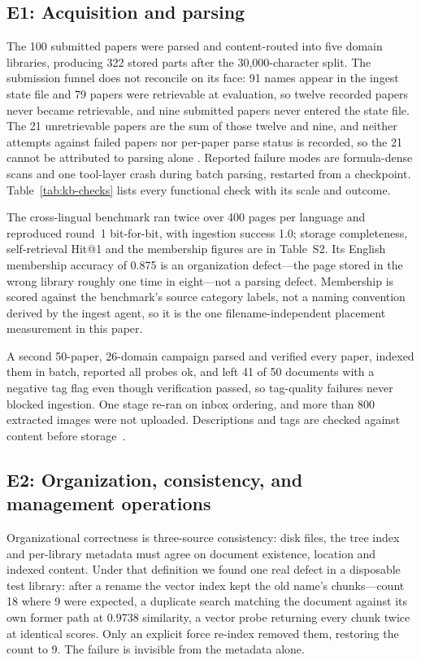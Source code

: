 \subsection{E1: Acquisition and parsing}
\label{sec:e1}

The 100 submitted papers were parsed and content-routed into five domain
libraries, producing 322 stored parts after the 30{,}000-character split. The
submission funnel does not reconcile on its face: 91 names appear in the ingest
state file and 79 papers were retrievable at evaluation, so twelve recorded
papers never became retrievable, and nine submitted papers never entered the
state file. The 21 unretrievable papers are the sum of those twelve and nine,
and neither attempts against failed papers nor per-paper parse status is
recorded, so the 21 cannot be attributed to parsing alone
\cite{missier-prov-2013}. Reported failure modes are formula-dense scans and
one tool-layer crash during batch parsing, restarted from a checkpoint.
Table~\ref{tab:kb-checks} lists every functional check with its scale and
outcome.

The cross-lingual benchmark ran twice over 400 pages per language and
reproduced round~1 bit-for-bit, with ingestion success 1.0; storage
completeness, self-retrieval Hit@1 and the membership figures are in
Table~S2. Its English membership accuracy of 0.875 is an organization
defect---the page stored in the wrong library roughly one time in eight---not
a parsing defect. Membership is scored against the benchmark's source category labels, not a
naming convention derived by the ingest agent, so it is the one
filename-independent placement measurement in this paper.

A second 50-paper, 26-domain campaign parsed and verified every paper, indexed
them in batch, reported all probes ok, and left 41 of 50 documents with a
negative tag flag even though verification passed, so tag-quality failures
never blocked ingestion.
One stage re-ran on inbox ordering, and more than 800 extracted images were
not uploaded. Descriptions and tags are checked against content before
storage~\cite{park-metadata-quality-2009}.


\subsection{E2: Organization, consistency, and management operations}
\label{sec:e2}


Organizational correctness is three-source consistency: disk files, the tree
index and per-library metadata must agree on document existence, location and
indexed content. Under that definition we found one real defect in a
disposable test library: after a rename the vector index kept the old name's
chunks---count 18 where 9 were expected, a duplicate search matching the
document against its own former path at 0.9738 similarity, a vector probe
returning every chunk twice at identical scores. Only an explicit force
re-index removed them, restoring the count to 9. The failure is invisible from
the metadata alone.

